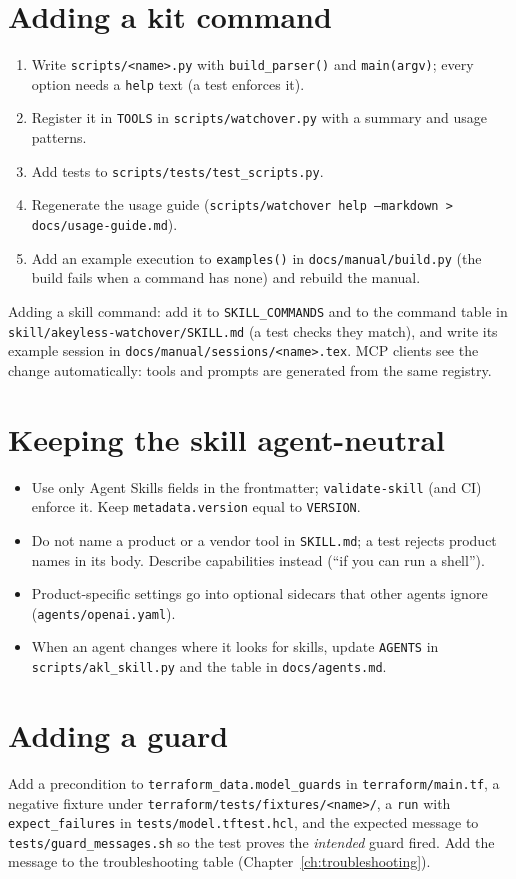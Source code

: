 \section{Adding a kit command}
\begin{enumerate}
\item Write \texttt{scripts/<name>.py} with \texttt{build\_parser()} and \texttt{main(argv)};
  every option needs a \texttt{help} text (a test enforces it).
\item Register it in \texttt{TOOLS} in \texttt{scripts/watchover.py} with a summary and usage patterns.
\item Add tests to \texttt{scripts/tests/test\_scripts.py}.
\item Regenerate the usage guide (\texttt{scripts/watchover help --markdown > docs/usage-guide.md}).
\item Add an example execution to \texttt{examples()} in \texttt{docs/manual/build.py} (the build
  fails when a command has none) and rebuild the manual.
\end{enumerate}
Adding a skill command: add it to \texttt{SKILL\_COMMANDS} and to the command table in
\texttt{skill/akeyless-watchover/SKILL.md} (a test checks they match), and write its example session
in \texttt{docs/manual/sessions/<name>.tex}. MCP clients see the change automatically: tools and
prompts are generated from the same registry.

\section{Keeping the skill agent-neutral}
\begin{itemize}
\item Use only Agent Skills fields in the frontmatter; \texttt{validate-skill} (and CI) enforce it.
  Keep \texttt{metadata.version} equal to \texttt{VERSION}.
\item Do not name a product or a vendor tool in \texttt{SKILL.md}; a test rejects product names in its body.
  Describe capabilities instead (``if you can run a shell'').
\item Product-specific settings go into optional sidecars that other agents ignore
  (\texttt{agents/openai.yaml}).
\item When an agent changes where it looks for skills, update \texttt{AGENTS} in
  \texttt{scripts/akl\_skill.py} and the table in \texttt{docs/agents.md}.
\end{itemize}

\section{Adding a guard}
Add a precondition to \texttt{terraform\_data.model\_guards} in \texttt{terraform/main.tf}, a
negative fixture under \texttt{terraform/tests/fixtures/<name>/}, a \texttt{run} with
\texttt{expect\_failures} in \texttt{tests/model.tftest.hcl}, and the expected message to
\texttt{tests/guard\_messages.sh} so the test proves the \emph{intended} guard fired. Add the
message to the troubleshooting table (Chapter~\ref{ch:troubleshooting}).

